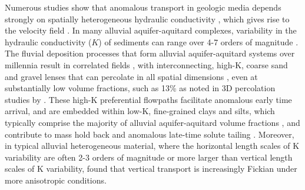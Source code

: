 Numerous studies show that anomalous transport in geologic media depends strongly on spatially heterogeneous hydraulic conductivity \citep{gelhar1993stochastic, dagan2005subsurface, de2005dealing}, which gives rise to the velocity field \citep{berkowitz2006modeling}. In many alluvial aquifer-aquitard complexes, variability in the hydraulic conductivity ($K$) of sediments can range over 4-7 orders of magnitude \citep{Fetter2001, fogg2016debates}. The fluvial deposition processes that form alluvial aquifer-aquitard systems over millennia result in correlated fields \citep{galloway2012terrigenous}, with interconnecting, high-K, coarse sand and gravel lenses \citep{fogg1986groundwater} that can percolate in all spatial dimensions \citep{fogg2000connected}, even at substantially low volume fractions, such as 13\% as noted in 3D percolation studies by \citet{harter2005finite}. These high-K preferential flowpaths facilitate anomalous early time arrival, and are embedded within low-K, fine-grained clays and silts, which typically comprise the majority of alluvial aquifer-aquitard volume fractions \citep{galloway2012terrigenous}, and contribute to mass hold back and anomalous late-time solute tailing \citep{labolle2001role, berkowitz2006modeling, haggerty2000late, benson2000application}. Moreover, in typical alluvial heterogeneous material, where the horizontal length scales of K variability are often 2-3 orders of magnitude or more larger than vertical length scales of K variability, \citet{zhang2006nonpoint} found that vertical transport is increasingly Fickian under more anisotropic conditions. %

